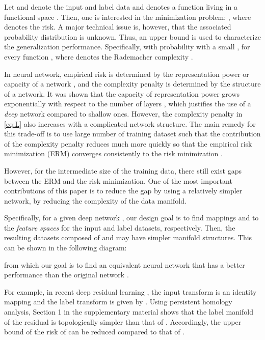 \documentclass[10pt,twocolumn,letterpaper]{article}
\begin{document}
Let 
 and  denote the input and label data and  denotes a function living in a functional space .
Then, one is interested in the minimization problem:
, 
where
 denotes the risk.
A major technical issue is, however, that the associated probability distribution  is unknown.
Thus, an upper bound is used to characterize the generalization performance.
Specifically, with probability  with a small , for every function , 
where  denotes the Rademacher complexity \cite{bartlett2002rademacher}.


In neural network, empirical risk is determined by the representation power or capacity of a network \cite{telgarsky2016benefits},
and the complexity penalty is determined by the structure of a network.
It was shown that the capacity of representation power grows exponentially with respect to the number of layers \cite{telgarsky2016benefits}, which justifies the use of a {\em deep } network compared to shallow ones.
However, the complexity penalty in \eqref{eq:L} also increases with a complicated network structure.
The main remedy for this trade-off is to use large number of training dataset such that the contribution of the complexity penalty
reduces much more quickly so that the empirical risk minimization (ERM) converges consistently to the risk minimization \cite{vapnik1998statistical}.

However, for the intermediate size of the training data, there still exist gaps between the ERM and the risk minimization.
One of the most important contributions of this paper is to reduce the gap by using a relatively simpler network,
by reducing the complexity of the data manifold. 

Specifically, for a given deep network ,
our design goal is to find mappings  and  to the {\em feature spaces} for the input and label datasets, respectively. Then, the resulting datasets composed of  and   may have simpler manifold structures.
This can be shown in the following diagram:

from which our goal is to find an equivalent neural network  that has a better performance
than the original network .



For example, in recent deep residual learning \cite{zhang2016beyond}, the input transform  is an identity mapping
and the label transform is given by  .
Using persistent homology analysis, Section 1 in the supplementary material shows that the label manifold of the residual is topologically simpler than that of .
Accordingly, the upper bound of the risk of  can be reduced compared to that of .
\end{document}
